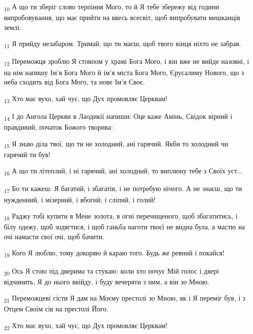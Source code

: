 \begin{tcolorbox}
\textsubscript{10} А що ти зберіг слово терпіння Мого, то й Я тебе збережу від години випробовування, що має прийти на ввесь всесвіт, щоб випробувати мешканців землі.
\end{tcolorbox}
\begin{tcolorbox}
\textsubscript{11} Я прийду незабаром. Тримай, що ти маєш, щоб твого вінця ніхто не забрав.
\end{tcolorbox}
\begin{tcolorbox}
\textsubscript{12} Переможця зроблю Я стовпом у храмі Бога Мого, і він вже не вийде назовні, і на нім напишу Ім'я Бога Мого й ім'я міста Бога Мого, Єрусалиму Нового, що з неба сходить від Бога Мого, та нове Ім'я Своє.
\end{tcolorbox}
\begin{tcolorbox}
\textsubscript{13} Хто має вухо, хай чує, що Дух промовляє Церквам!
\end{tcolorbox}
\begin{tcolorbox}
\textsubscript{14} І до Ангола Церкви в Лаодикії напиши: Оце каже Амінь, Свідок вірний і правдивий, початок Божого творива:
\end{tcolorbox}
\begin{tcolorbox}
\textsubscript{15} Я знаю діла твої, що ти не холодний, ані гарячий. Якби то холодний чи гарячий ти був!
\end{tcolorbox}
\begin{tcolorbox}
\textsubscript{16} А що ти літеплий, і ні гарячий, ані холодний, то виплюну тебе з Своїх уст...
\end{tcolorbox}
\begin{tcolorbox}
\textsubscript{17} Бо ти кажеш: Я багатий, і збагатів, і не потребую нічого. А не знаєш, що ти нужденний, і мізерний, і вбогий, і сліпий, і голий!
\end{tcolorbox}
\begin{tcolorbox}
\textsubscript{18} Раджу тобі купити в Мене золота, в огні перечищеного, щоб збагатитись, і білу одежу, щоб зодягтися, і щоб ганьба наготи твоєї не видна була, а мастю на очі намасти свої очі, щоб бачити.
\end{tcolorbox}
\begin{tcolorbox}
\textsubscript{19} Кого Я люблю, тому докоряю й караю того. Будь же ревний і покайся!
\end{tcolorbox}
\begin{tcolorbox}
\textsubscript{20} Ось Я стою під дверима та стукаю: коли хто почує Мій голос і двері відчинить, Я до нього ввійду, і буду вечеряти з ним, а він зо Мною.
\end{tcolorbox}
\begin{tcolorbox}
\textsubscript{21} Переможцеві сісти Я дам на Моєму престолі зо Мною, як і Я переміг був, і з Отцем Своїм сів на престолі Його.
\end{tcolorbox}
\begin{tcolorbox}
\textsubscript{22} Хто має вухо, хай чує, що Дух промовляє Церквам!
\end{tcolorbox}
